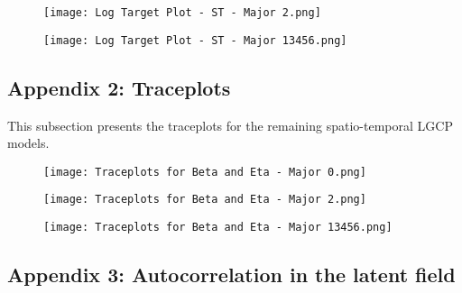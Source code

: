 \documentclass[a4paper]{thesis}
\begin{document}
\begin{figure}[H]
\begin{center}
\texttt{[image: Log Target Plot - ST - Major 2.png]}
\end{center}
\end{figure}

\begin{figure}[H]
\begin{center}
\texttt{[image: Log Target Plot - ST - Major 13456.png]}
\end{center}
\end{figure}

\subsection{Appendix 2: Traceplots}

This subsection presents the traceplots for the remaining spatio-temporal LGCP models. 

\begin{figure}[H]
\begin{center}
\texttt{[image: Traceplots for Beta and Eta - Major 0.png]}
\end{center}
\end{figure}

\begin{figure}[h]
\begin{center}
\texttt{[image: Traceplots for Beta and Eta - Major 2.png]}
\end{center}
\end{figure}

\begin{figure}[H]
\begin{center}
\texttt{[image: Traceplots for Beta and Eta - Major 13456.png]}
\end{center}
\end{figure}

\subsection{Appendix 3: Autocorrelation in the latent field}
\end{document}
